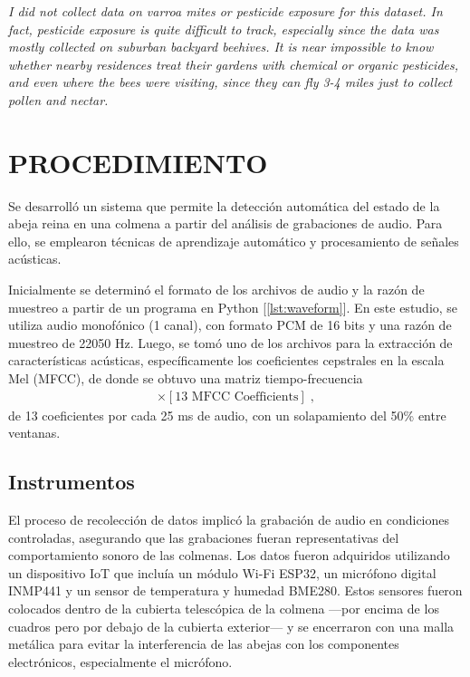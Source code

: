 \documentclass[12pt]{report}
\begin{document}
\par\textit{I did not collect data on varroa mites or pesticide exposure for this dataset. In fact, pesticide exposure is quite difficult to track, especially since the data was mostly collected on suburban backyard beehives. It is near impossible to know whether nearby residences treat their gardens with chemical or organic pesticides, and even where the bees were visiting, since they can fly 3-4 miles just to collect pollen and nectar.}


\section{PROCEDIMIENTO}

\par Se desarrolló un sistema que permite la detección automática del estado de la abeja reina en una colmena a partir del análisis de grabaciones de audio. Para ello, se emplearon técnicas de aprendizaje automático y procesamiento de señales acústicas.

\par Inicialmente se determinó el formato de los archivos de audio y la razón de muestreo a partir de un programa en Python [\ref{lst:waveform}]. En este estudio, se utiliza audio monofónico (1 canal), con formato PCM de 16 bits y una razón de muestreo de 22050 Hz. Luego, se tomó uno de los archivos para la extracción de características acústicas, específicamente los coeficientes cepstrales en la escala Mel (MFCC), de donde se obtuvo una matriz tiempo-frecuencia
\begin{align*}
[\text{Time Frames}] \times [\text{13 MFCC Coefficients}] \; ,
\end{align*}
de 13 coeficientes por cada 25 ms de audio, con un solapamiento del 50\% entre ventanas.

\subsection{Instrumentos}

\par El proceso de recolección de datos implicó la grabación de audio en condiciones controladas, asegurando que las grabaciones fueran representativas del comportamiento sonoro de las colmenas. Los datos fueron adquiridos utilizando un dispositivo IoT que incluía un módulo Wi-Fi ESP32, un micrófono digital INMP441 y un sensor de temperatura y humedad BME280. Estos sensores fueron colocados dentro de la cubierta telescópica de la colmena —por encima de los cuadros pero por debajo de la cubierta exterior— y se encerraron con una malla metálica para evitar la interferencia de las abejas con los componentes electrónicos, especialmente el micrófono.
\end{document}
